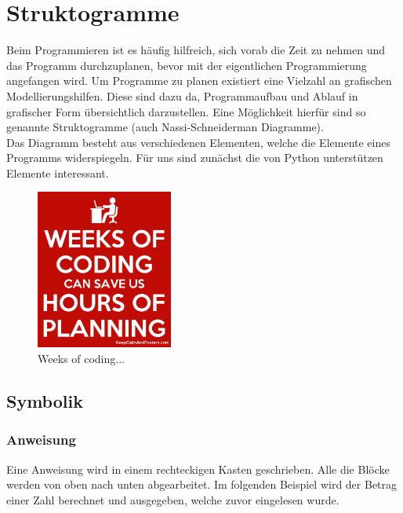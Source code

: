\section{Struktogramme}
Beim Programmieren ist es häufig hilfreich, sich vorab die Zeit zu nehmen und das Programm durchzuplanen, bevor mit der eigentlichen Programmierung angefangen wird. Um Programme zu planen existiert eine Vielzahl an grafischen Modellierungshilfen. Diese sind dazu da, Programmaufbau und Ablauf in grafischer Form übersichtlich darzustellen. Eine Möglichkeit hierfür sind so genannte Struktogramme (auch Nassi-Schneiderman Diagramme). \\
Das Diagramm besteht aus verschiedenen Elementen, welche die Elemente eines Programms widerspiegeln. Für uns sind zunächst die von Python unterstützen Elemente interessant.

\begin{figure}[H]
	\begin{center}
		\includegraphics[width=0.4\textwidth]{imgs/weeks_coding.png} %
		\caption{Weeks of coding...}
	\end{center}
\end{figure}

\subsection{Symbolik} \label{sec:Symbolik}
\subsubsection{Anweisung}
Eine Anweisung wird in einem rechteckigen Kasten geschrieben. Alle die Blöcke werden von oben nach unten abgearbeitet. Im folgenden Beispiel wird der Betrag einer Zahl berechnet und ausgegeben, welche zuvor eingelesen wurde.\\

